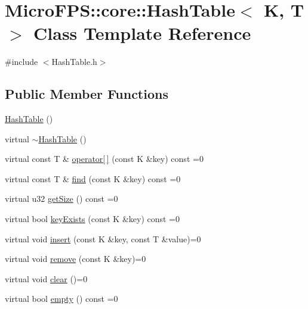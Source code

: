 \hypertarget{class_micro_f_p_s_1_1core_1_1_hash_table}{
\section{MicroFPS::core::HashTable$<$ K, T $>$ Class Template Reference}
\label{d7/db3/class_micro_f_p_s_1_1core_1_1_hash_table}
}


{\ttfamily \#include $<$HashTable.h$>$}

\subsection*{Public Member Functions}
\begin{DoxyCompactItemize}
\item 
\hyperlink{class_micro_f_p_s_1_1core_1_1_hash_table_a1162a7e515a6288a3fd49a05299fcb4e}{HashTable} ()
\item 
virtual \hyperlink{class_micro_f_p_s_1_1core_1_1_hash_table_a48f4851b2b119194052a1f93e56180ea}{$\sim$HashTable} ()
\item 
virtual const T \& \hyperlink{class_micro_f_p_s_1_1core_1_1_hash_table_a94bc5dc4e8353fd39d51465d83828a3b}{operator\mbox{[}$\,$\mbox{]}} (const K \&key) const =0
\item 
virtual const T \& \hyperlink{class_micro_f_p_s_1_1core_1_1_hash_table_ad96f5cbe755cd2d8b4e8633b969489dd}{find} (const K \&key) const =0
\item 
virtual u32 \hyperlink{class_micro_f_p_s_1_1core_1_1_hash_table_a3f21c54a6c75a9f16499be982e3f3c86}{getSize} () const =0
\item 
virtual bool \hyperlink{class_micro_f_p_s_1_1core_1_1_hash_table_a11aff99da06bd89ec3c9015d7ddec438}{keyExists} (const K \&key) const =0
\item 
virtual void \hyperlink{class_micro_f_p_s_1_1core_1_1_hash_table_af6e9b65e34cd636d84ac99f9586a19de}{insert} (const K \&key, const T \&value)=0
\item 
virtual void \hyperlink{class_micro_f_p_s_1_1core_1_1_hash_table_a82d9e9b8be6b29c97444a07793ed3580}{remove} (const K \&key)=0
\item 
virtual void \hyperlink{class_micro_f_p_s_1_1core_1_1_hash_table_a39b2a430fdc7b6b9ea9b10b8763d2d0d}{clear} ()=0
\item 
virtual bool \hyperlink{class_micro_f_p_s_1_1core_1_1_hash_table_a6053bd903038d231771cbaee16247e99}{empty} () const =0
\end{DoxyCompactItemize}


